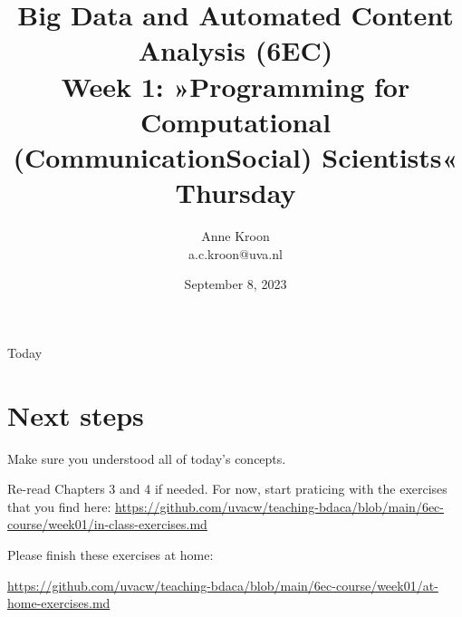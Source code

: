 

\graphicspath{{../../resources/img/}}




\title[Big Data and Automated Content Analysis]{\textbf{Big Data and Automated Content Analysis (6EC)} 
\\Week 1: »Programming for Computational (Communication\textbar Social) Scientists«
\\Thursday }
\author[Anne Kroon]{Anne Kroon\\ \footnotesize{a.c.kroon@uva.nl}}
\date{September 8, 2023}

\begin{frame}{}
	\titlepage
\end{frame}

\begin{frame}{Today}
	\tableofcontents
\end{frame}






\section{Next steps}


\begin{frame}[standout]
Make sure you understood all of today's concepts.

Re-read Chapters 3 and 4 if needed.
For now, start praticing with the exercises that you find here:
\large{\url{https://github.com/uvacw/teaching-bdaca/blob/main/6ec-course/week01/in-class-exercises.md}}

Please finish these exercises at home: 

\large{\url{https://github.com/uvacw/teaching-bdaca/blob/main/6ec-course/week01/at-home-exercises.md}}
\end{frame}


\begin{frame}
	\printbibliography
\end{frame}


